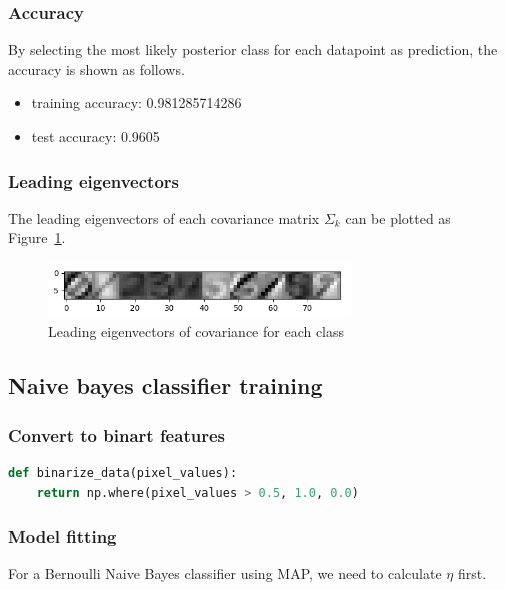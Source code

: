 \documentclass[a4paper]{article}
\begin{document}
\subsubsection{Accuracy}

By selecting the most likely posterior class for each datapoint as prediction, the accuracy is shown as follows.

\begin{itemize}
    \item training accuracy: 0.981285714286
    \item test accuracy: 0.9605
\end{itemize}

\subsubsection{Leading eigenvectors}

The leading eigenvectors of each covariance matrix $\Sigma_k$ can be plotted as Figure~\ref{fig: Leading_eigenvectors}.

\begin{figure}[htbp]
\centering
\includegraphics[width = 8cm]{Leading_eigenvectors}
\caption{Leading eigenvectors of covariance for each class}
\label{fig: Leading_eigenvectors}
\end{figure}

\subsection{Naive bayes classifier training}

\subsubsection{Convert to binart features}

\begin{lstlisting}[language = Python]
def binarize_data(pixel_values):
    return np.where(pixel_values > 0.5, 1.0, 0.0)
\end{lstlisting}

\subsubsection{Model fitting}

For a Bernoulli Naive Bayes classifier using MAP, we need to calculate $\eta$ first.
\end{document}
